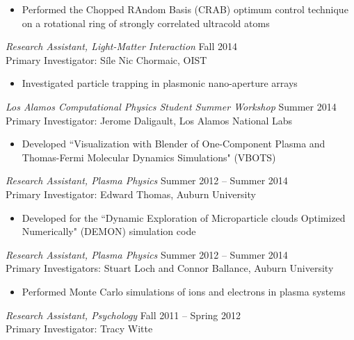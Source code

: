 \documentclass[margin, 10pt, a4paper]{res} %
\begin{document}
\begin{resume}
\begin{itemize}[label = {}] \itemsep -2pt %
\item Performed the Chopped RAndom Basis (CRAB) optimum control technique on a rotational ring of strongly correlated ultracold atoms
\end{itemize}

{\sl Research Assistant, Light-Matter Interaction} \hfill Fall 2014 \\
Primary Investigator: S\'ile Nic Chormaic, OIST

\begin{itemize}[label = {}] \itemsep -2pt %
\item Investigated particle trapping in plasmonic nano-aperture arrays
\end{itemize}

{\sl Los Alamos Computational Physics Student Summer Workshop} \hfill Summer 2014 \\
Primary Investigator: Jerome Daligault, Los Alamos National Labs
\begin{itemize}[label = {}] \itemsep -2pt %
\item Developed ``Visualization with Blender of One-Component Plasma and Thomas-Fermi Molecular Dynamics Simulations" (VBOTS)
\end{itemize}

{\sl Research Assistant, Plasma Physics} \hfill Summer 2012 -- Summer 2014 \\
Primary Investigator: Edward Thomas, Auburn University

\begin{itemize}[label = {}] \itemsep -2pt %
\item Developed for the ``Dynamic Exploration of Microparticle clouds Optimized Numerically" (DEMON) simulation code
\end{itemize}

{\sl Research Assistant, Plasma Physics} \hfill Summer 2012 -- Summer 2014\\
Primary Investigators: Stuart Loch and Connor Ballance, Auburn University
\begin{itemize} [label = {}]
\item Performed Monte Carlo simulations of ions and electrons in plasma systems
\end{itemize} 

{\sl Research Assistant, Psychology} \hfill Fall 2011 -- Spring 2012\\
Primary Investigator: Tracy Witte


\end{resume}
\end{document}
